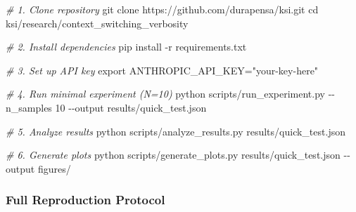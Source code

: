 \documentclass[
  11pt]{article}
\newenvironment{Shaded}{}{}
\newcommand{\AttributeTok}[1]{\textcolor[rgb]{0.49,0.56,0.16}{#1}}
\newcommand{\BuiltInTok}[1]{\textcolor[rgb]{0.00,0.50,0.00}{#1}}
\newcommand{\CommentTok}[1]{\textcolor[rgb]{0.38,0.63,0.69}{\textit{#1}}}
\newcommand{\ExtensionTok}[1]{#1}
\newcommand{\FunctionTok}[1]{\textcolor[rgb]{0.02,0.16,0.49}{#1}}
\newcommand{\NormalTok}[1]{#1}
\newcommand{\OperatorTok}[1]{\textcolor[rgb]{0.40,0.40,0.40}{#1}}
\newcommand{\StringTok}[1]{\textcolor[rgb]{0.25,0.44,0.63}{#1}}
\newcommand{\VariableTok}[1]{\textcolor[rgb]{0.10,0.09,0.49}{#1}}
\begin{document}
\begin{Shaded}
\begin{Highlighting}[]
\CommentTok{\# 1. Clone repository}
\FunctionTok{git}\NormalTok{ clone https://github.com/durapensa/ksi.git}
\BuiltInTok{cd}\NormalTok{ ksi/research/context\_switching\_verbosity}

\CommentTok{\# 2. Install dependencies}
\ExtensionTok{pip}\NormalTok{ install }\AttributeTok{{-}r}\NormalTok{ requirements.txt}

\CommentTok{\# 3. Set up API key}
\BuiltInTok{export} \VariableTok{ANTHROPIC\_API\_KEY}\OperatorTok{=}\StringTok{"your{-}key{-}here"}

\CommentTok{\# 4. Run minimal experiment (N=10)}
\ExtensionTok{python}\NormalTok{ scripts/run\_experiment.py }\AttributeTok{{-}{-}n\_samples}\NormalTok{ 10 }\AttributeTok{{-}{-}output}\NormalTok{ results/quick\_test.json}

\CommentTok{\# 5. Analyze results}
\ExtensionTok{python}\NormalTok{ scripts/analyze\_results.py results/quick\_test.json}

\CommentTok{\# 6. Generate plots}
\ExtensionTok{python}\NormalTok{ scripts/generate\_plots.py results/quick\_test.json }\AttributeTok{{-}{-}output}\NormalTok{ figures/}
\end{Highlighting}
\end{Shaded}

\subsubsection{Full Reproduction
Protocol}\label{full-reproduction-protocol}
\end{document}
